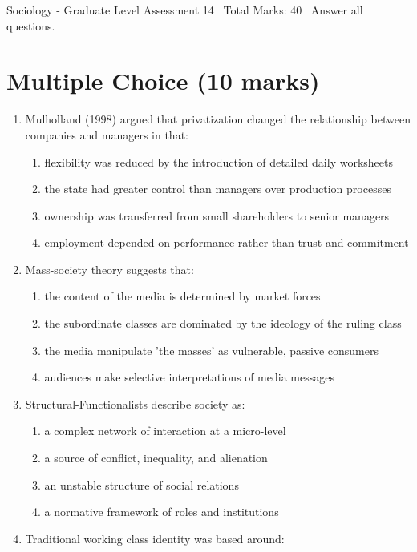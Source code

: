 \documentclass[12pt]{article}
\begin{document}
\begin{center}
Sociology - Graduate Level Assessment 14 \
Total Marks: 40 \
Answer all questions.
\end{center}

\section*{Multiple Choice (10 marks)}
\begin{enumerate}[label=\arabic*.]
\item Mulholland (1998) argued that privatization changed the relationship between companies and managers in that:
\begin{enumerate}[label=(\alph*)]
    \item flexibility was reduced by the introduction of detailed daily worksheets
    \item the state had greater control than managers over production processes
    \item ownership was transferred from small shareholders to senior managers
    \item employment depended on performance rather than trust and commitment
\end{enumerate}
\item Mass-society theory suggests that:
\begin{enumerate}[label=(\alph*)]
    \item the content of the media is determined by market forces
    \item the subordinate classes are dominated by the ideology of the ruling class
    \item the media manipulate 'the masses' as vulnerable, passive consumers
    \item audiences make selective interpretations of media messages
\end{enumerate}
\item Structural-Functionalists describe society as:
\begin{enumerate}[label=(\alph*)]
    \item a complex network of interaction at a micro-level
    \item a source of conflict, inequality, and alienation
    \item an unstable structure of social relations
    \item a normative framework of roles and institutions
\end{enumerate}
\item Traditional working class identity was based around:

\end{enumerate}
\end{document}
